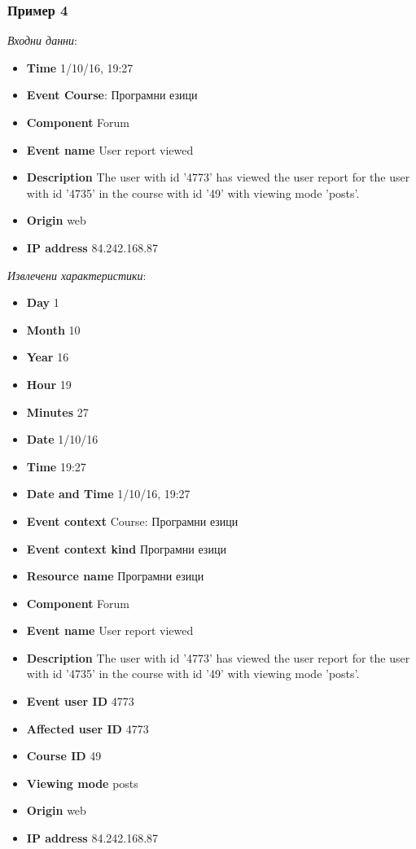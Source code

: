 \documentclass[a4paper, 12pt]{article}
\begin{document}
\subsubsection{Пример 4}		
\textit{Входни данни}:			
\begin{itemize}
\item \textbf{Time} 1/10/16, 19:27
\item \textbf{Event Course}: Програмни езици
\item \textbf{Component} Forum
\item \textbf{Event name} User report viewed
\item \textbf{Description} The user with id '4773' has viewed the user report for the user with id '4735' in the course with id '49' with viewing mode 'posts'.
\item \textbf{Origin} web
\item \textbf{IP address} 84.242.168.87
\end{itemize}	

\textit{Извлечени характеристики}:
\begin{itemize}
\item \textbf{Day} 1
\item \textbf{Month} 10
\item \textbf{Year} 16
\item \textbf{Hour} 19
\item \textbf{Minutes} 27
\item \textbf{Date} 1/10/16
\item \textbf{Time} 19:27
\item \textbf{Date and Time} 1/10/16, 19:27
\item \textbf{Event context} Course: Програмни езици
\item \textbf{Event context kind} Програмни езици
\item \textbf{Resource name} Програмни езици
\item \textbf{Component} Forum
\item \textbf{Event name} User report viewed
\item \textbf{Description} The user with id '4773' has viewed the user report for the user with id '4735' in the course with id '49' with viewing mode 'posts'.
\item \textbf{Event user ID} 4773
\item \textbf{Affected user ID} 4773
\item \textbf{Course ID} 49
\item \textbf{Viewing mode} posts
\item \textbf{Origin} web
\item \textbf{IP address} 84.242.168.87
\end{itemize}
\end{document}
